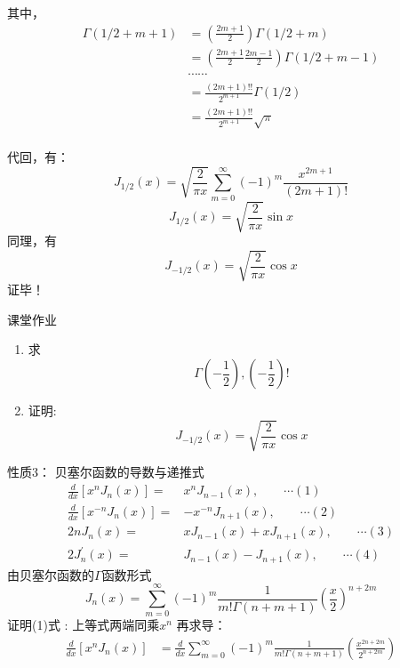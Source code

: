 	其中， 
	\begin{equation*}
		\begin{split}
			\Gamma(1/2+m+1) &= (\frac{2m+1}{2}) \Gamma(1/2+m) \\
			& = (\frac{2m+1}{2}\frac{2m-1}{2})  \Gamma(1/2+m-1) \\
			&\cdots \cdots \\
			& = \frac{(2m+1)!!}{2^{m+1}} \Gamma(1/2) \\
			& = \frac{(2m+1)!!}{2^{m+1}} \sqrt{\pi} \\
		\end{split}	
	\end{equation*}	



	代回，有：
	\begin{equation*}
		J_{1/2}(x) = \sqrt{\frac{2}{\pi x}} \sum\limits_{m=0}^{\infty} (-1)^m  \frac{x^{2m+1}}{(2m+1)!} 
	\end{equation*}	 
	\begin{equation*}
		J_{1/2}(x) = \sqrt{\frac{2}{\pi x}} \sin x  
	\end{equation*}	 
	同理，有 
	\begin{equation*}
		J_{-1/2}(x) = \sqrt{\frac{2}{\pi x}} \cos x  
	\end{equation*}	 
	{\alert{证毕！} }



	{课堂作业}
	\begin{enumerate}
		\item 求 \[\Gamma(-\frac{1}{2}), (-\frac{1}{2}) !\]
		\item 证明: \[ J_{-1/2}(x) = \sqrt{\frac{2}{\pi x}} \cos x \]
	\end{enumerate}



	{\alert{性质3：}} 贝塞尔函数的导数与递推式 \\
	\begin{equation*}
		\begin{split}
			\frac{d}{d x}\left[x^{n} J_{n}(x)\right]= &x^{n} J_{n-1}(x),\qquad \cdots (1) \\
			\frac{d}{d x}\left[x^{-n} J_{n}(x)\right]=& -x^{-n} J_{n+1}(x) ,\qquad \cdots (2) \\
			2 n J_{n}(x)=&xJ_{n-1}(x)+x J_{n+1}(x) ,\qquad \cdots (3) \\
			2 J_{n}^{\prime}(x)=&J_{n-1}(x)-J_{n+1}(x) ,\qquad \cdots (4) 
		\end{split}
	\end{equation*}		
	由贝塞尔函数的$\Gamma$函数形式 
	\begin{equation*}
		J_n(x) = \sum\limits_{m=0}^{\infty} (-1)^m  \frac{1}{m! \Gamma(n+m+1) } (\frac{x}{2})^{n+2m} 
	\end{equation*}	 
	{\alert{证明(1)式} }: 上等式两端同乘$x^n$ 再求导：
	\begin{equation*}
	\begin{split}
		\frac{d}{dx} [x^n J_n(x)]&= \frac{d}{dx}\sum\limits_{m=0}^{\infty} (-1)^m  
		\frac{1}{m! \Gamma(n+m+1) } (\frac{x^{2n+2m}}{2^{n+2m}})\\	
	\end{split}
	\end{equation*}		



